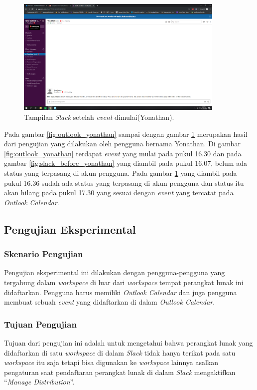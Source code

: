\begin{figure}[h]
  \includegraphics[width=10cm]{./Gambar/PengujianYonathan/Slack_After.png}
  \centering
  \caption{Tampilan \textit{Slack} setelah \textit{event} dimulai(Yonathan).}
  \label{fig:slack_after_yonathan}
\end{figure}

Pada gambar \ref{fig:outlook_yonathan} sampai dengan gambar \ref{fig:slack_after_yonathan} merupakan hasil dari pengujian yang dilakukan oleh pengguna bernama Yonathan. Di gambar \ref{fig:outlook_yonathan} terdapat \textit{event} yang mulai pada pukul 16.30 dan pada gambar \ref{fig:slack_before_yonathan} yang diambil pada pukul 16.07, belum ada status yang terpasang di akun pengguna. Pada gambar \ref{fig:slack_after_yonathan} yang diambil pada pukul 16.36 sudah ada status yang terpasang di akun pengguna dan status itu akan hilang pada pukul 17.30 yang sesuai dengan \textit{event} yang tercatat pada \textit{Outlook Calendar}. 
\clearpage

\subsection{Pengujian Eksperimental}
\subsubsection{Skenario Pengujian}
Pengujian eksperimental ini dilakukan dengan pengguna-pengguna yang tergabung dalam \textit{workspace} di luar dari \textit{workspace} tempat perangkat lunak ini didaftarkan. Pengguna harus memiliki \textit{Outlook Calendar} dan juga pengguna membuat sebuah \textit{event} yang didaftarkan di dalam \textit{Outlook Calendar}.
\subsubsection{Tujuan Pengujian}
Tujuan dari pengujian ini adalah untuk mengetahui bahwa perangkat lunak yang didaftarkan di satu \textit{workspace} di dalam \textit{Slack} tidak hanya terikat pada satu \textit{workspace} itu saja tetapi bisa digunakan ke \textit{workspace} lainnya asalkan pengaturan saat pendaftaran perangkat lunak di dalam \textit{Slack} mengaktifkan ``\textit{Manage Distribution}''. 
